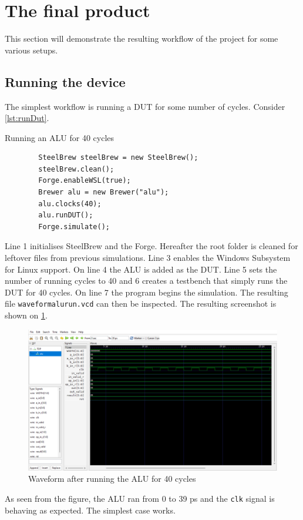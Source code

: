 \section{The final product}\label{sec:07}
This section will demonstrate the resulting workflow of the project for some various setups.
\subsection{Running the device}
The simplest workflow is running a DUT for some number of cycles. Consider \cref{lst:runDut}.
\begin{listing}
    \centering
    \caption{Running an ALU for 40 cycles}\label{lst:runDut}
    \begin{verbatim}
        SteelBrew steelBrew = new SteelBrew();
        steelBrew.clean();
        Forge.enableWSL(true);
        Brewer alu = new Brewer("alu");
        alu.clocks(40);
        alu.runDUT();
        Forge.simulate();
    \end{verbatim}
\end{listing}
Line 1 initialises SteelBrew and the Forge. Hereafter the root folder is cleaned for leftover files from previous simulations. Line 3 enables the Windows Subsystem for Linux support. On line 4 the ALU is added as the DUT. Line 5 sets the number of running cycles to 40 and 6 creates a testbench that simply runs the DUT for 40 cycles. On line 7 the program begins the simulation. The resulting file \texttt{waveformalurun.vcd} can then be inspected. The resulting screenshot is shown on \cref{fig:runDut}.
\begin{figure}
    \centering
    \caption{Waveform after running the ALU for 40 cycles}\label{fig:runDut}
    \includegraphics[width=.8\textwidth]{graphics/runDUT.png}
\end{figure}
As seen from the figure, the ALU ran from 0 to 39 ps and the \texttt{clk} signal is behaving as expected. The simplest case works.
